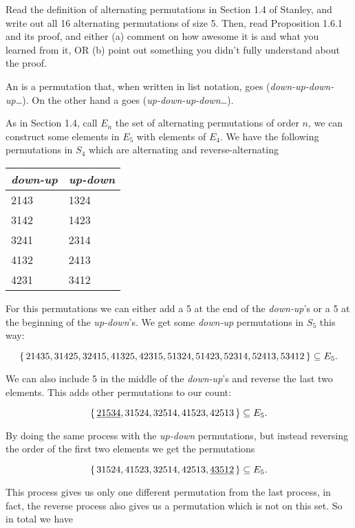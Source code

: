 \documentclass[12pt]{memoir}
\begin{document}
\begin{Ej}[Exercise 3]
   Read the definition of alternating permutations in Section 1.4 of Stanley, and write out all 16 alternating permutations of size 5. Then, read Proposition 1.6.1 and its proof, and either (a)
comment on how awesome it is and what you learned from it, OR (b) point out something you didn't fully understand about the proof.
\end{Ej}

\begin{ptcbr}
An  is a permutation that, when written in list notation, goes (\emph{down-up-down-up\dots}). On the other hand a  goes (\emph{up-down-up-down\dots}).\par 
As in Section 1.4, call $E_n$ the set of alternating permutations of order $n$, we can construct some elements in $E_5$ with elements of $E_4$. We have the following permutations in $S_4$ which are alternating and reverse-alternating
\begin{center}
   \begin{tabular}{l|l}
      \emph{down-up} & \emph{up-down} \\
      \hline
      2143&1324   \\
      3142&1423   \\
      3241&2314   \\
        4132&2413   \\
        4231&3412  
      \end{tabular}
\end{center}
For this permutations we can either add a 5 at the end of the \emph{down-up}'s or a 5 at the beginning of the \emph{up-down}'s. We get some \emph{down-up} permutations in $S_5$ this way:

$$\{\,21435,31425,32415,41325,42315,51324,51423,52314,52413,53412\,\}\subseteq E_5.$$

We can also include 5 in the middle of the \emph{down-up}'s and reverse the last two elements. This adds other permutations to our count:

$$\{\,\underline{21534},31524,32514,41523,42513\,\}\subseteq E_5.$$

By doing the same process with the \emph{up-down} permutations, but instead reversing the order of the first two elements we get the permutations 

$$\{\,31524,41523,32514,42513,\underline{43512}\,\}\subseteq E_5.$$

This process gives us only one different permutation from the last process, in fact, the reverse process also gives us a permutation which is not on this set. So in total we have


\end{ptcbr}
\end{document}
